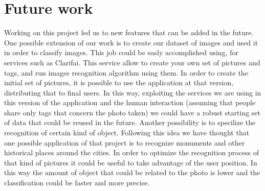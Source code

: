 \section{Future work}
\label{sec:future}

Working on this project led us to new features that can be added in the future.
One possible extension of our work is to create our dataset of images and used it in order to classify images. This job could be easly accomplished using, for services such as Clarifai. This service allow to create your own set of pictures and tags, and run images recognition algorithm using them. In order to create the initial set of pictures, it is possible to use the application at that version, distributing that to final users. In this way, exploiting the services we are using in this version of the application and the human interaction (assuming that people share only tags that concern the photo taken) we could have a robust starting set of data that could be reused in the future. 
Another possibility is to specilize the recognition of certain kind of object. Following this idea we have thought that one possible application of that project is to recognize monuments and other historical places around the cities. In order to optimize the recognition process of that kind of pictures it could be useful to take advantage of the user position. In this way the amount of object that could be related to the photo is lower and the classification could be faster and more precise. 